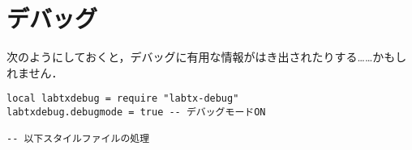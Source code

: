 \documentclass[a4paper,lualatex]{jlreq}
\begin{document}
\section{デバッグ}
次のようにしておくと，デバッグに有用な情報がはき出されたりする……かもしれません．
\begin{lstlisting}
local labtxdebug = require "labtx-debug"
labtxdebug.debugmode = true -- デバッグモードON

-- 以下スタイルファイルの処理
\end{lstlisting}
\end{document}
